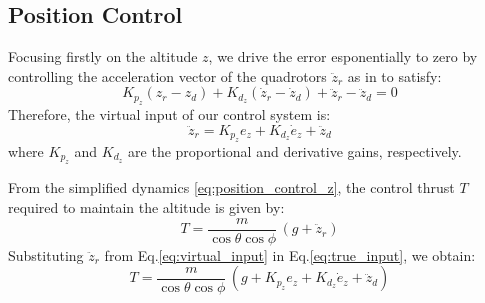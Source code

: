 \subsection{Position Control}
Focusing firstly on the altitude $z$,
we drive the error esponentially to zero by controlling the acceleration
vector of the quadrotors $\ddot{z}_r$ as in \cite{simplified_model} to satisfy:
\[
 K_{p_z} ( z_r - z_d )  + K_{d_z} (\dot{z}_r - \dot{z}_d ) + \ddot{z}_r - \ddot{z}_d = 0
\]
\noindent
Therefore, the virtual input of our control system is:
\begin{equation}
    \ddot{z}_r  =  K_{p_z} e_z + K_{d_z} \dot{e}_z + \ddot{z}_d
    \label{eq:virtual_input}
\end{equation}
where \( K_{p_z} \) and \( K_{d_z} \) are the  proportional and derivative gains, respectively.

\noindent
From the simplified dynamics \eqref{eq:position_control_z}, 
the control thrust \( T \) required to maintain the altitude is given by:
\begin{equation}
    T = \frac{m}{\cos\theta \cos\phi} \, (g + \ddot{z}_r)
    \label{eq:true_input}
\end{equation}
\noindent
Substituting \( \ddot{z}_r \) from Eq.\ref{eq:virtual_input} in Eq.\ref{eq:true_input},
we obtain:
\begin{equation}
    T = \frac{m}{\cos\theta \cos\phi} \, \left( g + K_{p_z} e_z + K_{d_z} \dot{e}_z + \ddot{z}_d \right)
    \label{eq:desired_thrust}
\end{equation}

